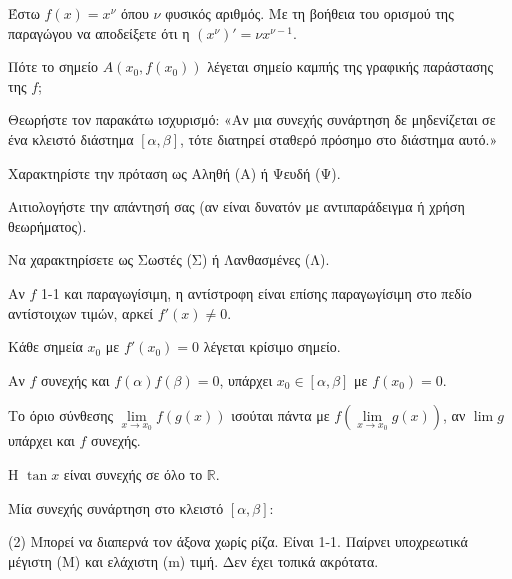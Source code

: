 \documentclass[11pt,a4paper]{article}
\newcommand{\kerkissans}[1]{{\fontfamily{maksf}\selectfont \textbf{#1}}}
\renewcommand{\textdexiakeraia}{}
\newcommand\themanum{A}
\newcounter{thema}[section]
\renewcommand{\thethema}{\arabic{thema}}
\newcommand{\Thema}{\refstepcounter{thema}{\textbf{\textcolor{black}{\faPenSquare\ \  \large \kerkissans{\textbf{\thethemaο\hspace{2mm}Διαγώνισμα - Θέμα \themanum}}}}}\hspace{0mm}}{}
\newenvironment{thema}[1]
{\begin{tcolorbox}[title=\Thema\kerkissans{\textbf{\large{  #1}}},breakable,
enhanced standard,titlerule=0pt,toprule=0pt, rightrule=0pt, bottomrule=0pt,
colback=white,left=0mm,top=1mm,bottom=0mm,
boxrule=0pt,
colframe=white,leftrule=0mm,sharp corners,coltitle=black]
\renewcommand{\themanum}{#1}}
{\end{tcolorbox}}
\begin{document}
\begin{thema}{A}
\begin{erwthma}
    \item Έστω $f(x) = x^\nu$ όπου $\nu$ φυσικός αριθμός. Με τη βοήθεια του ορισμού της παραγώγου να αποδείξετε ότι η $(x^\nu)' = \nu x^{\nu - 1}$.
    \item Πότε το σημείο $A(x_0, f(x_0))$ λέγεται σημείο καμπής της γραφικής παράστασης της $f$;
    \item Θεωρήστε τον παρακάτω ισχυρισμό:
    «Αν μια συνεχής συνάρτηση δε μηδενίζεται σε ένα κλειστό διάστημα $[\alpha, \beta]$, τότε διατηρεί σταθερό πρόσημο στο διάστημα αυτό.»
    \begin{alist}
    \item Χαρακτηρίστε την πρόταση ως Αληθή (Α) ή Ψευδή (Ψ).
    \item Αιτιολογήστε την απάντησή σας (αν είναι δυνατόν με αντιπαράδειγμα ή χρήση θεωρήματος).
    \end{alist}
    \item Να χαρακτηρίσετε ως Σωστές (Σ) ή Λανθασμένες (Λ).
    \begin{alist}
        \item Αν $f$ 1-1 και παραγωγίσιμη, η αντίστροφη είναι επίσης παραγωγίσιμη στο πεδίο αντίστοιχων τιμών, αρκεί $f'(x) \ne 0$.
        \item Κάθε σημεία $x_0$ με $f'(x_0)=0$ λέγεται κρίσιμο σημείο.
        \item Αν $f$ συνεχής και $f(\alpha)f(\beta)=0$, υπάρχει $x_0 \in [\alpha, \beta]$ με $f(x_0)=0$.
        \item Το όριο σύνθεσης $\lim\limits_{x\to x_0} f(g(x))$ ισούται πάντα με $f(\lim\limits_{x\to x_0} g(x))$, αν $\lim g$ υπάρχει και $f$ συνεχής.
        \item H $\tan x$ είναι συνεχής σε όλο το $\mathbb{R}$.
    \end{alist}
    \item Μία συνεχής συνάρτηση στο κλειστό $[\alpha, \beta]$:
    \begin{tasks}[label=\let\textdexiakeraia\relax\alph*.](2)
        \task Μπορεί να διαπερνά τον άξονα χωρίς ρίζα.
        \task Είναι 1-1.
        \task Παίρνει υποχρεωτικά μέγιστη (Μ) και ελάχιστη (m) τιμή.
        \task Δεν έχει τοπικά ακρότατα.
    \end{tasks}
\end{erwthma}
\end{thema}
\vspace{1cm}
\end{document}
